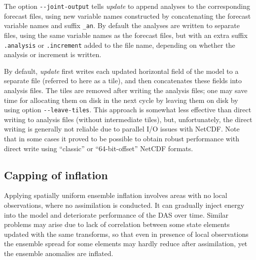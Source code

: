 \documentclass[11pt]{report}
\begin{document}
The option \verb|--joint-output| tells \emph{update} to append analyses to the corresponding forecast files, using new variable names constructed by concatenating the forecast variable names and suffix \verb|_an|.
By default the analyses are written to separate files, using the same variable names as the forecast files, but with an extra suffix \verb|.analysis| or \verb|.increment| added to the file name, depending on whether the analysis or increment is written.

By default, \emph{update} first writes each updated horizontal field of the model to a separate file (referred to here as a tile), and then concatenates these fields into analysis files.
The tiles are removed after writing the analysis files; one may save time for allocating them on disk in the next cycle by leaving them on disk by using option \verb|--leave-tiles|.
This approach is somewhat less effective than direct writing to analysis files (without intermediate tiles), but, unfortunately, the direct writing is generally not reliable due to parallel I/O issues with NetCDF.
Note that in some cases it proved to be possible to obtain robust performance with direct write using ``classic'' or ``64-bit-offset'' NetCDF formats.

\subsection{Capping of inflation}
\label{sec:capping}

Applying spatially uniform ensemble inflation involves areas with no local observations, where no assimilation is conducted.
It can gradually inject energy into the model and deteriorate performance of the DAS over time.
Similar problems may arise due to lack of correlation between some state elements updated with the same transforms, so that even in presence of local observations the ensemble spread for some elements may hardly reduce after assimilation, yet the ensemble anomalies are inflated.
\end{document}
